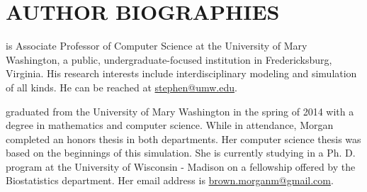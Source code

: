 \section*{AUTHOR BIOGRAPHIES}

 is Associate Professor of Computer Science at
the University of Mary Washington, a public, undergraduate-focused institution
in Fredericksburg, Virginia. His research interests include interdisciplinary
modeling and simulation of all kinds. He can be reached at
\href{mailto:stephen@umw.edu}{stephen@umw.edu}.

\vspace{.1in}

 graduated from the University of Mary Washington
in the spring of 2014 with a degree in mathematics and computer science. While
in attendance, Morgan completed an honors thesis in both departments. Her
computer science thesis was based on the beginnings of this simulation. She is
currently studying in a Ph. D. program at the University of Wisconsin -
Madison on a fellowship offered by the Biostatistics department. Her email
address is \href{mailto:brown.morganm@gmail.com}{brown.morganm@gmail.com}.

